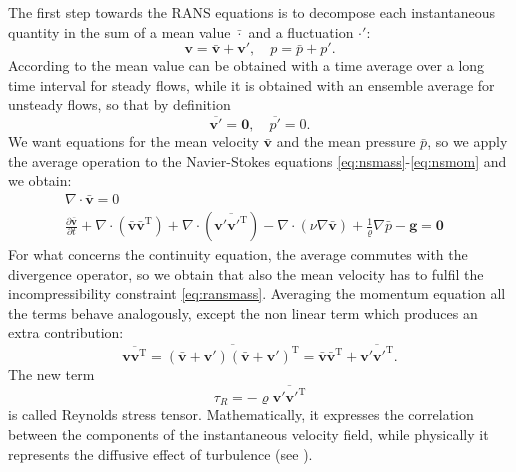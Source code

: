 The first step towards the RANS equations is to decompose each instantaneous 
quantity in the sum of a mean value $\bar{\cdot}$ and a fluctuation $\cdot'$: 
\begin{equation} \label{eq:decomp}
\mathbf{v} = \bar{\mathbf{v}} + \mathbf{v}', \quad p = \bar{p} + p'.
\end{equation}
According to \cite{main:vermal} the mean value can be obtained with a time 
average over a long time interval 
for steady flows, while it is obtained with an ensemble average for unsteady 
flows, so that by definition
\begin{equation}
	\overline{\mathbf{v}'} = \mathbf{0}, \quad \overline{p'}=0.
\end{equation}
We want equations for the mean 
velocity $\bar{\mathbf{v}}$ and the mean pressure $\bar{p}$, so we apply the 
average operation to the Navier-Stokes equations 
\eqref{eq:nsmass}-\eqref{eq:nsmom} and we obtain:
\begin{align}
\label{eq:ransmass} \nabla \cdot \bar{\mathbf{v}} = 0&\\
\label{eq:ransmom} \frac{\partial \bar{\mathbf{v}}}{\partial t} + \nabla \cdot 
( 
\bar{\mathbf{v}} \bar{\mathbf{v}}^\mathrm{T}) + \nabla \cdot 
(\overline{\mathbf{v}' {\mathbf{v}'}^\mathrm{T}})- \nabla \cdot (\nu \nabla 
\bar{\mathbf{v}}) +\frac{1}{\varrho} \nabla \bar{p} - \mathbf{g} = \mathbf{0}&
\end{align}
For what concerns the continuity equation, the average commutes with the 
divergence operator, so we obtain that also the mean velocity has to fulfil the 
incompressibility constraint \eqref{eq:ransmass}. Averaging the momentum 
equation all the terms behave analogously, except the non linear term which 
produces an extra contribution:
\begin{equation}
	\overline{\mathbf{v} \mathbf{v}^\mathrm{T}} = \overline{(\bar{\mathbf{v}} + 
	\mathbf{v}') (\bar{\mathbf{v}} + \mathbf{v}')^\mathrm{T}} = 
	\bar{\mathbf{v}} \bar{\mathbf{v}}^\mathrm{T} + \overline{\mathbf{v}' 
	{\mathbf{v}'}^\mathrm{T}}.
\end{equation}
The new term
\begin{equation}
\tau_R = -\varrho \overline{\mathbf{v}' {\mathbf{v}'}^\mathrm{T}}
\end{equation}
is called Reynolds stress tensor. Mathematically, it expresses the correlation 
between the components of the instantaneous velocity field, while physically it 
represents the diffusive effect of turbulence (see \cite{main:vermal}).
%
